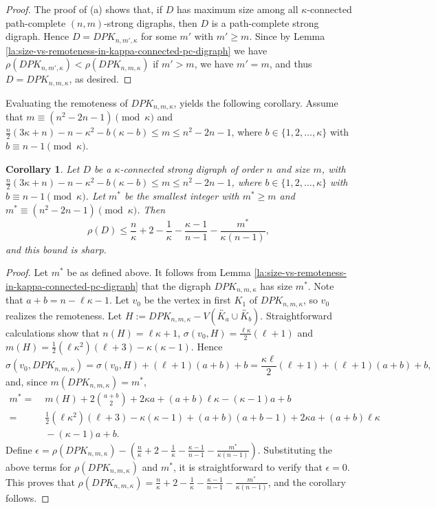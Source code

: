 \documentclass[a4paper,11pt]{article}
\newtheorem{corollary}[theorem]%
{Corollary}
\begin{document}
\begin{proof}
The proof of (a) shows that, if $D$ has maximum size among all $\kappa$-connected
path-complete $(n,m)$-strong digraphs, then $D$ is a path-complete strong digraph. Hence $D=DPK_{n,m',\kappa}$ for some $m'$ with $m' \geq m$. Since by Lemma \ref{la:size-vs-remoteness-in-kappa-connected-pc-digraph} we have 
$\rho(DPK_{n,m',\kappa}) < \rho(DPK_{n,m,\kappa})$ if $m'>m$, we have $m'=m$, 
and thus $D=DPK_{n,m,\kappa}$, as desired. 
\end{proof}

Evaluating the remoteness of $DPK_{n,m,\kappa}$, yields the following corollary. Assume that $m \equiv (n^2-2n-1) \pmod{\kappa} $ and $ \frac{n}{2}(3\kappa+n)-n-\kappa^2-b(\kappa-b) \leq m \leq n^2-2n-1$, where $b \in \{1,2,\ldots, \kappa\}$ with
$b \equiv n-1 \pmod{\kappa}$.
	
\begin{corollary}\label{coro:evaluation-of-kappa-connecetd-path-complete-strong-digraph}
Let $D$ be a $\kappa$-connected strong digraph of order $n$ and size $m$, with $ \frac{n}{2}(3\kappa+n)-n-\kappa^2-b(\kappa-b) \leq m \leq n^2-2n-1$, where $b \in \{1,2,\ldots, \kappa\}$ with $b \equiv n-1 \pmod{\kappa}$. Let $m^{*}$ be the smallest integer with $m^* \geq m$ and $m^* \equiv (n^2-2n-1) \pmod{\kappa} $. Then 
\[ \rho(D) \leq  \frac{n}{\kappa}+2-\frac{1}{\kappa}-\frac{\kappa-1}{n-1}-\frac{m^*}{\kappa(n-1)}, \]
and this bound is sharp.  
\end{corollary}
 
\begin{proof}
Let $m^*$ be as defined above. It follows from Lemma \ref{la:size-vs-remoteness-in-kappa-connected-pc-digraph} that
the digraph $DPK_{n,m,\kappa}$ has size $m^*$. Note that $a+b=n-\ell\kappa-1$. Let $v_0$ be the vertex in first $K_1$ of $DPK_{n,m,\kappa}$, so $v_0$ realizes the remoteness. 
Let $H:= DPK_{n,m,\kappa}-V(\overleftrightarrow{K_a} \cup \overleftrightarrow{K_b})$. 
Straightforward calculations show that $n(H)=\ell\kappa+1$, 
$\sigma(v_0,H)=\frac{\ell\kappa}{2}(\ell+1)$ and 
$m(H)=\frac{1}{2}(\ell\kappa^2)(\ell+3)-\kappa(\kappa-1)$. Hence
\[\sigma(v_0,DPK_{n,m,\kappa})=\sigma(v_0,H)+(\ell+1)(a+b)+b=\frac{\kappa\ell}{2}(\ell+1)+(\ell+1)(a+b)+b,\]
and, since $m(DPK_{n,m,\kappa})=m^*$,  
\begin{align*}
m^* =& \; m(H)+2{a+b \choose 2}+2\kappa a +(a+b)\ell\kappa-(\kappa-1)a+b \\
=& \; \frac{1}{2}(\ell\kappa^2)(\ell+3)-\kappa(\kappa-1)+(a+b)(a+b-1)+2\kappa a +(a+b)\ell\kappa\\
&\;-(\kappa-1)a+b.
\end{align*}
Define $\epsilon=\rho(DPK_{n,m,\kappa})-\left(\frac{n}{\kappa}+2-\frac{1}{\kappa}-\frac{\kappa-1}{n-1}-\frac{m^*}{\kappa(n-1)}\right)$. 
Substituting the above terms for $\rho(DPK_{n,m,\kappa})$ and $m^*$, it is straightforward 
to verify that $\epsilon=0$. 
This proves that 
$\rho(DPK_{n,m,\kappa}) 
     =\frac{n}{\kappa}+2-\frac{1}{\kappa}-\frac{\kappa-1}{n-1}-\frac{m^*}{\kappa(n-1)}$,
and the corollary follows.
\end{proof}
\end{document}
